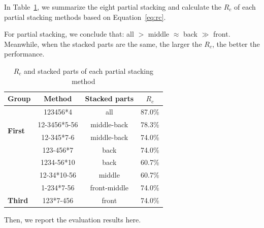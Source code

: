 \documentclass{article}
\begin{document}
In Table~\ref{tab:parital}, we summarize the eight partial stacking and calculate the $R_c$ of each partial stacking methods based on Equation~\ref{eq:rc}.

For partial stacking, we conclude that: all $>$ middle $\approx$ back $\gg$ front. Meanwhile, when the stacked parts are the same, the larger the $R_c$, the better the performance.

\begin{table}[H]
\caption{$R_c$ and stacked parts of each partial stacking method}\label{tab:parital}\vspace{2mm}
    \centering
    \begin{tabular}{l|ccc}
        \hline
        \toprule
        \textbf{Group} & \textbf{Method} & \textbf{Stacked parts} & $R_c$ \\
        \hline
        \multirow{4}{*}{\textbf{First}} & 123456*4 & all & 87.0\%\\
        & 12-3456*5-56 & middle-back & 78.3\% \\
        & 12-345*7-6 & middle-back & 74.0\% \\
        & 123-456*7 & back & 74.0\% \\
        \hdashline
        \multirow{3}{*}{\textbf{Second}} & 1234-56*10 & back & 60.7\% \\
        & 12-34*10-56 & middle & 60.7\% \\
        & 1-234*7-56 & front-middle & 74.0\% \\
        \hdashline
        \textbf{Third} & 123*7-456 & front & 74.0\% \\
        \hline
        \bottomrule
    \end{tabular}
\end{table}

Then, we report the evaluation results here.
\end{document}
